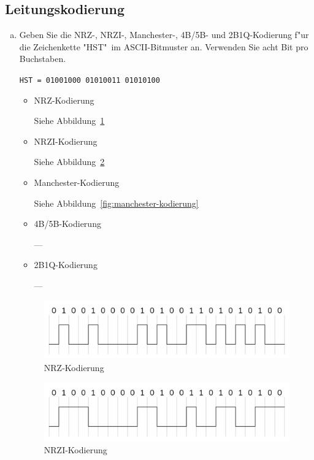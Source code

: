 \setcounter{section}{2}
\setcounter{subsection}{12} %
\subsection{Leitungskodierung}

\begin{enumerate}[(a)]
    \item Geben Sie die NRZ-, NRZI-, Manchester-, 4B/5B- und 2B1Q-Kodierung
        f"ur die Zeichenkette "HST"\ im ASCII-Bitmuster an. Verwenden Sie acht
        Bit pro Buchstaben.

        \verb|HST = 01001000 01010011 01010100|

        \begin{itemize}
            \item NRZ-Kodierung

                Siehe Abbildung~\ref{fig:nrz-kodierung}

            \item NRZI-Kodierung

                Siehe Abbildung~\ref{fig:nrzi-kodierung}

            \item Manchester-Kodierung

                Siehe Abbildung~\ref{fig:manchester-kodierung}

            \item 4B/5B-Kodierung

                ---

            \item 2B1Q-Kodierung

                ---
        \end{itemize}

\begin{figure}[p]
    \vspace{-10px}
    \includegraphics[width=1\textwidth]{./assets/2.13.nrz.png}
    \caption{NRZ-Kodierung}
    \label{fig:nrz-kodierung}
\end{figure}

\begin{figure}[p]
    \vspace{-10px}
    \includegraphics[width=1\textwidth]{./assets/2.13.nrzi.png}
    \caption{NRZI-Kodierung}
    \label{fig:nrzi-kodierung}
\end{figure}


\end{enumerate}
